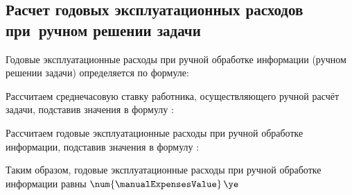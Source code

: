 \subsection{Расчет годовых эксплуатационных расходов при~ручном решении задачи}
\label{sec:economics:manualexpenses}

Годовые эксплуатационные расходы при ручной обработке информации (ручном решении задачи) определяется по формуле:
\manualExpensesEquation

Рассчитаем среднечасовую ставку работника, осуществляющего ручной расчёт задачи, подставив значения в формулу :
\monkerHourRateFormulaApplied

Рассчитаем годовые эксплуатационные расходы при ручной обработке информации, подставив значения в формулу :
\manualExpensesFormulaApplied

Таким образом, годовые эксплуатационные расходы при ручной обработке информации равны \(\num{\manualExpensesValue} \, \ye\)